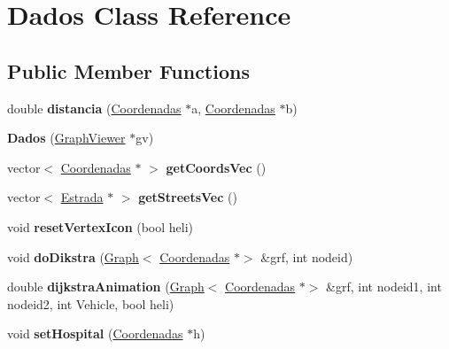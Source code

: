 \hypertarget{class_dados}{}\section{Dados Class Reference}
\label{class_dados}
\subsection*{Public Member Functions}
\begin{DoxyCompactItemize}
\item 
\hypertarget{class_dados_a36ab23feacc6b4c140daf063fd84a73b}{}\label{class_dados_a36ab23feacc6b4c140daf063fd84a73b} 
double {\bfseries distancia} (\hyperlink{class_coordenadas}{Coordenadas} $\ast$a, \hyperlink{class_coordenadas}{Coordenadas} $\ast$b)
\item 
\hypertarget{class_dados_aa55d11a27311aa33ea02115486c577d5}{}\label{class_dados_aa55d11a27311aa33ea02115486c577d5} 
{\bfseries Dados} (\hyperlink{class_graph_viewer}{Graph\+Viewer} $\ast$gv)
\item 
\hypertarget{class_dados_a6b639b659a4aceb2f47b3393bc286b56}{}\label{class_dados_a6b639b659a4aceb2f47b3393bc286b56} 
vector$<$ \hyperlink{class_coordenadas}{Coordenadas} $\ast$ $>$ {\bfseries get\+Coords\+Vec} ()
\item 
\hypertarget{class_dados_a84da44685f662f5e83c9d6579e105ab8}{}\label{class_dados_a84da44685f662f5e83c9d6579e105ab8} 
vector$<$ \hyperlink{class_estrada}{Estrada} $\ast$ $>$ {\bfseries get\+Streets\+Vec} ()
\item 
\hypertarget{class_dados_ac90a691fabdbd9e49356b74bb3cdd1b9}{}\label{class_dados_ac90a691fabdbd9e49356b74bb3cdd1b9} 
void {\bfseries reset\+Vertex\+Icon} (bool heli)
\item 
\hypertarget{class_dados_a9526a815aa8bd6fc68f0230c2537521b}{}\label{class_dados_a9526a815aa8bd6fc68f0230c2537521b} 
void {\bfseries do\+Dikstra} (\hyperlink{class_graph}{Graph}$<$ \hyperlink{class_coordenadas}{Coordenadas} $\ast$$>$ \&grf, int nodeid)
\item 
\hypertarget{class_dados_a16e953ed200f3e97989a4584d2103d1c}{}\label{class_dados_a16e953ed200f3e97989a4584d2103d1c} 
double {\bfseries dijkstra\+Animation} (\hyperlink{class_graph}{Graph}$<$ \hyperlink{class_coordenadas}{Coordenadas} $\ast$$>$ \&grf, int nodeid1, int nodeid2, int Vehicle, bool heli)
\item 
\hypertarget{class_dados_a11e89b4b61e80eaa30a6360c721f9d76}{}\label{class_dados_a11e89b4b61e80eaa30a6360c721f9d76} 
void {\bfseries set\+Hospital} (\hyperlink{class_coordenadas}{Coordenadas} $\ast$h)

\end{DoxyCompactItemize}
